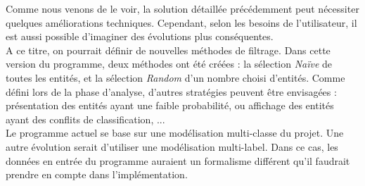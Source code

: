 Comme nous venons de le voir, la solution détaillée précédemment peut nécessiter quelques améliorations techniques. Cependant, selon les besoins de l'utilisateur, il est aussi possible d'imaginer des évolutions plus conséquentes.\\

A ce titre, on pourrait définir de nouvelles méthodes de filtrage. Dans cette version du programme, deux méthodes ont été créées : la sélection \textit{Naïve} de toutes les entités, et la sélection \textit{Random} d'un nombre choisi d'entités. Comme défini lors de la phase d'analyse, d'autres stratégies peuvent être envisagées : présentation des entités ayant une faible probabilité, ou affichage des entités ayant des conflits de classification, ... \\

Le programme actuel se base sur une modélisation multi-classe du projet. Une autre évolution serait d'utiliser une modélisation multi-label. Dans ce cas, les données en entrée du programme auraient un formalisme différent qu'il faudrait prendre en compte dans l'implémentation.
